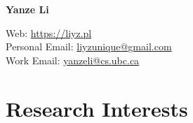 \documentclass[12pt,letterpaper]{report}
\newcommand{\myname}{Yanze Li}
\newcommand{\namefont}[1]{{\normalfont\bfseries\Huge{#1}}}
\begin{document}
\raggedright

\namefont{\myname}

\vspace{1em}
\begin{minipage}[c]{0.7\textwidth}
	Web: \href{https://liyz.pl}{https://liyz.pl} \\
	Personal Email: \href{mailto:liyzunique@gmail.com}{liyzunique@gmail.com} \\
	Work Email: \href{mailto:yanzeli@cs.ubc.ca}{yanzeli@cs.ubc.ca}
\end{minipage}
\vspace{-0.5em}


\section*{Research Interests}
\end{document}
